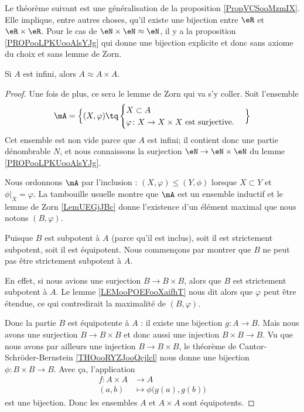 Le théorème suivant est une généralisation de la proposition \ref{PropVCSooMzmIX}. Elle implique, entre autres choses, qu'il existe une bijection entre \( \eR\) et \( \eR\times \eR\). Pour le cas de \( \eN\times \eN\approx \eN\), il y a la proposition \ref{PROPooLPKUooAlsYJg} qui donne une bijection explicite et donc sans axiome du choix et sans lemme de Zorn.
\begin{theorem}     \label{THOooDGOVooRdURVi}
    Si \( A\) est infini, alors \( A\approx A\times A\).
\end{theorem}

\begin{proof}
    Une fois de plus, ce sera le lemme de Zorn qui va s'y coller. Soit l'ensemble
    \begin{equation}
       \mA=\Big\{  (X,\varphi)  \tq
        \begin{cases}
            X\subset A\\
            \varphi\colon X\to X\times X\text{ est surjective.}
        \end{cases}
    \Big\}
    \end{equation}
    Cet ensemble est non vide parce que \( A\) est infini; il contient donc une partie dénombrable \( N\), et nous connaissons la surjection \( \eN\to \eN\times \eN\) du lemme \ref{PROPooLPKUooAlsYJg}.

    Nous ordonnons \( \mA\) par l'inclusion : \( (X,\varphi)\leq (Y,\phi)\) lorsque \( X\subset Y\) et \( \phi|_X=\varphi\). La tambouille usuelle montre que \( \mA\) est un ensemble inductif et le lemme de Zorn \ref{LemUEGjJBc} donne l'existence d'un élément maximal que nous notons \( (B,\varphi)\).

    Puisque \( B\) est subpotent à \( A\) (parce qu'il est inclus), soit il est strictement subpotent, soit il est équipotent. Nous commençons par montrer que \( B\) ne peut pas être strictement subpotent à \( A\).

    En effet, si nous avions une surjection \( B\to B\times B\), alors que \( B\) est strictement subpotent à \( A\). Le lemme \ref{LEMooPOEFooXaifhT} nous dit alors que \( \varphi\) peut être étendue, ce qui contredirait la maximalité de \( (B,\varphi)\).

    Donc la partie \( B\) est équipotente à \( A\) : il existe une bijection \( g\colon A\to B\). Mais nous avons une surjection \( B\to B\times B\) et donc aussi une injection \( B\times B\to B\). Vu que nous avons par ailleurs une injection \( B\to B\times B\), le théorème de Cantor-Schröder-Bernstein \ref{THOooRYZJooQcjlcl} nous donne une bijection \( \phi\colon B\times B\to B\). Avec ça, l'application
    \begin{equation}
        \begin{aligned}
            f\colon A\times A&\to A \\
            (a,b)&\mapsto \phi\big( g(a),g(b) \big) 
        \end{aligned}
    \end{equation}
    est une bijection. Donc les ensembles \( A\) et \( A\times A\) sont équipotents.
\end{proof}

